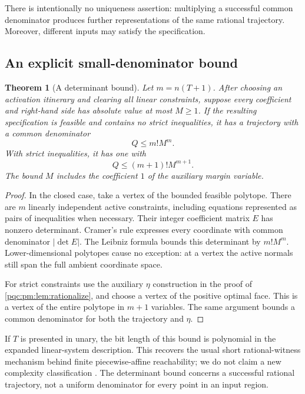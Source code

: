 \documentclass[11pt,letterpaper]{article}
\numberwithin{equation}{section}
\newtheorem{theorem}{Theorem}[section]
\theoremstyle{definition}
\theoremstyle{remark}
\begin{document}
There is intentionally no uniqueness assertion: multiplying a successful
common denominator produces further representations of the same rational
trajectory. Moreover, different inputs may satisfy the specification.

\subsection{An explicit small-denominator bound}

\begin{theorem}[A determinant bound]\label{pqc:pm:thm:denom-small}
Let $m=n(T+1)$. After choosing an activation itinerary and clearing all linear
constraints, suppose every coefficient and right-hand side has absolute value
at most $M\geq1$. If the resulting specification is feasible and contains no
strict inequalities, it has a trajectory with a common denominator
\[
 Q\leq m!M^m.
\]
With strict inequalities, it has one with
\[
 Q\leq (m+1)!M^{m+1}.
\]
The bound $M$ includes the coefficient $1$ of the auxiliary margin variable.
\end{theorem}

\begin{proof}
In the closed case, take a vertex of the bounded feasible polytope. There are
$m$ linearly independent active constraints, including equations represented
as pairs of inequalities when necessary. Their integer coefficient matrix
$E$ has nonzero determinant. Cramer's rule expresses every coordinate with
common denominator $|\det E|$. The Leibniz formula bounds this determinant
by $m!M^m$. Lower-dimensional polytopes cause no exception: at a vertex the
active normals still span the full ambient coordinate space.

For strict constraints use the auxiliary $\eta$ construction in the proof
of \cref{pqc:pm:lem:rationalize}, and choose a vertex of the positive optimal face.
This is a vertex of the entire polytope in $m+1$ variables. The same argument
bounds a common denominator for both the trajectory and $\eta$.
\end{proof}

If $T$ is presented in unary, the bit length of this bound is polynomial in
the expanded linear-system description. This recovers the usual short
rational-witness mechanism behind finite piecewise-affine reachability;
we do not claim a new complexity classification \cite{b62s15-bounded-reachability}.
The determinant bound concerns a successful rational trajectory, not a
uniform denominator for every point in an input region.
\end{document}
